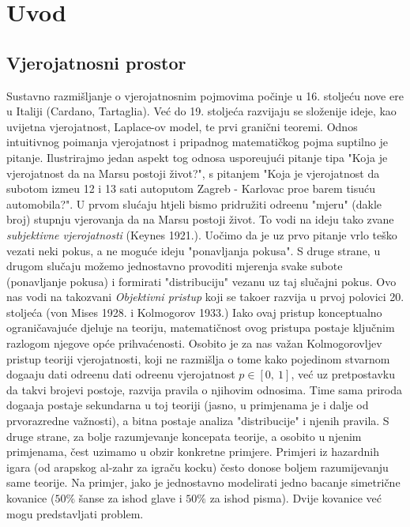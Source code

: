 
\part{Uvod}

\chapter{Vjerojatnosni prostor}

Sustavno razmi\v sljanje o vjerojatnosnim pojmovima po\v cinje u 16.
stolje\' cu nove ere u Italiji (Cardano, Tartaglia). Ve\' c do 19.
stolje\' ca razvijaju se slo\v zenije ideje, kao uvijetna vjerojatnost,
Laplace-ov model, te prvi grani\v cni teoremi. Odnos intuitivnog
poimanja vjerojatnost i pripadnog matemati\v ckog pojma suptilno
je pitanje. Ilustrirajmo jedan aspekt tog odnosa uspore\dj uju\' ci
pitanje tipa "Koja je vjerojatnost da na Marsu postoji \v zivot?",
s pitanjem "Koja je vjerojatnost da subotom izme\dj u 12 i 13 sati
autoputom Zagreb - Karlovac pro\dj e barem tisu\' cu automobila?".
U prvom slu\' caju htjeli bismo pridru\v ziti odre\dj enu "mjeru"
(dakle broj) stupnju vjerovanja da na Marsu postoji \v zivot.
To vodi na ideju tako zvane \emph{subjektivne vjerojatnosti}
(Keynes 1921.). Uo\v cimo da je uz prvo pitanje vrlo te\v sko
vezati neki pokus, a ne mogu\' ce ideju "ponavljanja pokusa".
S druge strane, u drugom slu\v caju mo\v zemo jednostavno provoditi
mjerenja svake subote (ponavljanje pokusa) i formirati "distribuciju"
vezanu uz taj slu\v cajni pokus. Ovo nas vodi na takozvani
\emph{Objektivni pristup} koji se tako\dj er razvija u prvoj polovici
20. stolje\' ca (von Mises 1928. i Kolmogorov 1933.) Iako ovaj
pristup konceptualno ograni\v cavaju\' ce djeluje na teoriju,
matemati\v cnost ovog pristupa postaje klju\v cnim razlogom njegove
op\' ce prihva\' cenosti.
Osobito je za nas va\v zan Kolmogorovljev pristup teoriji
vjerojatnosti, koji ne razmi\v slja o tome kako pojedinom stvarnom
doga\dj aju dati odre\dj enu dati odre\dj enu vjerojatnost
$p \in [0, \: 1]$, ve\' c uz pretpostavku da takvi brojevi postoje,
razvija pravila o njihovim odnosima. Time sama priroda doga\dj aja
postaje sekundarna u toj teoriji (jasno, u primjenama je i dalje od
prvorazredne va\v znosti), a bitna postaje analiza "distribucije"
i njenih pravila.
S druge strane, za bolje razumjevanje koncepata teorije, a osobito
u njenim primjenama, \v cest uzimamo u obzir konkretne primjere.
Primjeri iz hazardnih igara (od arapskog al-zahr za igra\v cu
kocku) \v cesto donose boljem razumijevanju same teorije. Na
primjer, jako je jednostavno modelirati jedno bacanje simetri\v cne
kovanice ($50\%$ \v sanse za ishod glave i $50\%$ za ishod pisma).
Dvije kovanice ve\' c mogu predstavljati problem.

